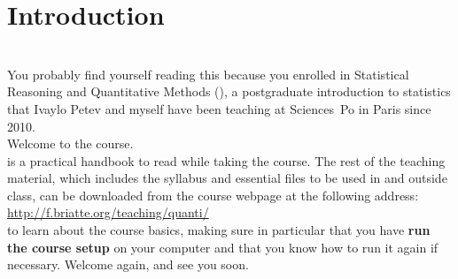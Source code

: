%
%
\chapter{Introduction}%
	\label{ch:intro}
  \begin{mybox}%
    \\[1em]%
  	You probably find yourself reading this because you enrolled in Statistical Reasoning and Quantitative Methods (\SRQM), a postgraduate introduction to statistics that Ivaylo Petev and myself have been teaching at Sciences~Po in Paris since 2010.\\[1em]%
    Welcome to the course.\\[1em]%
     is a practical handbook to read while taking the course. The rest of the teaching material, which includes the syllabus and essential files to be used in and outside class, can be downloaded from the course webpage at the following address:\\[1em]%
      \url{http://f.briatte.org/teaching/quanti/}\\[1em]%
     to learn about the course basics, making sure in particular that you have \textbf{run the course setup} on your computer and that you know how to run it again if necessary. Welcome again, and see you soon.%
  \end{mybox}\bigskip%
  \startcontents[chapters]%
	\newpage%

%
%
%
%
%
%
%
%
%
%
%

\stopcontents[chapters]
